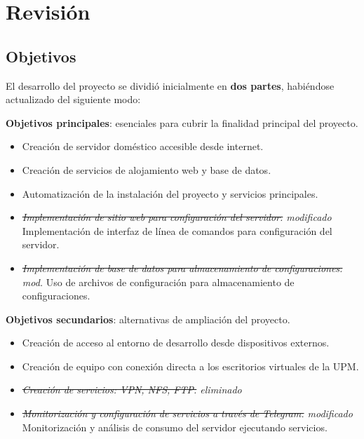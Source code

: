 \section{Revisión} \label{chapters:revision:sections:revision}

\subsection{Objetivos} \label{chapters:revision:sections:revision:subsections:objetivos}

El desarrollo del proyecto se dividió inicialmente en \textbf{dos partes}, habiéndose actualizado del siguiente modo:

\textbf{Objetivos principales}: esenciales para cubrir la finalidad principal del proyecto.
\begin{itemize}[itemsep=0em]
    \item Creación de servidor doméstico accesible desde internet.
    \item Creación de servicios de alojamiento web y base de datos.
    \item Automatización de la instalación del proyecto y servicios principales.
    \item \textit{\textcolor{black!50}{\sout{Implementación de sitio web para configuración del servidor.} modificado}} \newline
    Implementación de interfaz de línea de comandos para configuración del servidor.
    \item \textit{\textcolor{black!50}{\sout{Implementación de base de datos para almacenamiento de configuraciones.} mod.}} \newline
    Uso de archivos de configuración para almacenamiento de configuraciones.
\end{itemize}

\textbf{Objetivos secundarios}: alternativas de ampliación del proyecto.
\begin{itemize}[itemsep=0em]
    \item Creación de acceso al entorno de desarrollo desde dispositivos externos.
    \item Creación de equipo con conexión directa a los escritorios virtuales de la UPM.
    \item \textit{\textcolor{black!50}{\sout{Creación de servicios: VPN, NFS, FTP.} eliminado}}
    \item \textit{\textcolor{black!50}{\sout{Monitorización y configuración de servicios a través de Telegram.} modificado}} \newline
    Monitorización y análisis de consumo del servidor ejecutando servicios.
\end{itemize}

